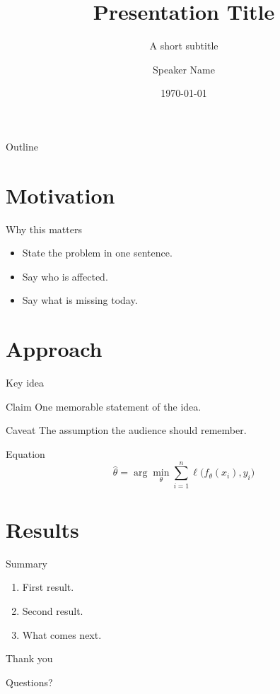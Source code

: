 \documentclass[aspectratio=169,11pt]{beamer}
\title{Presentation Title}
\subtitle{A short subtitle}
\author{Speaker Name}
\institute{Institution}
\date{\today}
\begin{document}
\begin{frame}
  \titlepage
\end{frame}

\begin{frame}{Outline}
  \tableofcontents
\end{frame}

\section{Motivation}

\begin{frame}{Why this matters}
  \begin{itemize}
    \item State the problem in one sentence.
    \item Say who is affected.
    \item Say what is missing today.
  \end{itemize}
\end{frame}

\section{Approach}

\begin{frame}{Key idea}
  \begin{block}{Claim}
    One memorable statement of the idea.
  \end{block}
  \begin{alertblock}{Caveat}
    The assumption the audience should remember.
  \end{alertblock}
\end{frame}

\begin{frame}{Equation}
  \[
    \hat{\theta} = \arg\min_{\theta} \sum_{i=1}^{n} \ell\bigl(f_\theta(x_i), y_i\bigr)
  \]
\end{frame}

\section{Results}

\begin{frame}{Summary}
  \begin{enumerate}
    \item First result.
    \item Second result.
    \item What comes next.
  \end{enumerate}
\end{frame}

\begin{frame}[plain]
  \centering
  \Large Thank you\par
  \normalsize Questions?
\end{frame}
\end{document}

